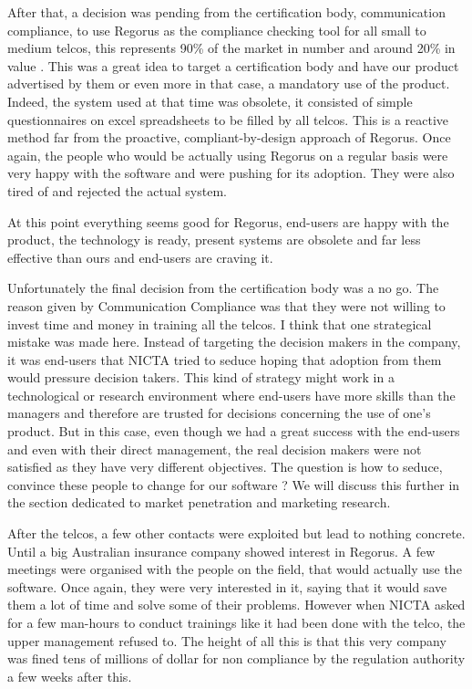 \documentclass[10pt]{report}
\begin{document}
After that, a decision was pending from the certification body, communication compliance, to use Regorus as the compliance checking tool for all small to medium telcos, this represents 90\% of the market in number and around 20\% in value \autocite{telcoIndustryStats}. This was a great idea to target a certification body and have our product advertised by them or even more in that case, a mandatory use of the product. Indeed, the system used at that time was obsolete, it consisted of simple questionnaires on excel spreadsheets to be filled by all telcos. This is a reactive method far from the proactive, compliant-by-design approach of Regorus. Once again, the people who would be actually using Regorus on a regular basis were very happy with the software and were pushing for its adoption. They were also tired of and rejected the actual system.

At this point everything seems good for Regorus, end-users are happy with the product, the technology is ready, present systems are obsolete and far less effective than ours and end-users are craving it.

Unfortunately the final decision from the certification body was a no go. The reason given by Communication Compliance was that they were not willing to invest time and money in training all the telcos. I think that one strategical mistake was made here. Instead of targeting the decision makers in the company, it was end-users that NICTA tried to seduce hoping that adoption from them would pressure decision takers. This kind of strategy might work in a technological or research environment where end-users have more skills than the managers and therefore are trusted for decisions concerning the use of one's product. But in this case, even though we had a great success with the end-users and even with their direct management, the real decision makers were not satisfied as they have very different objectives. The question is how to seduce, convince these people to change for our software ? We will discuss this further in the section dedicated to market penetration and marketing research.

After the telcos, a few other contacts were exploited but lead to nothing concrete. Until a big Australian insurance company showed interest in Regorus. A few meetings were organised with the people on the field, that would actually use the software. Once again, they were very interested in it, saying that it would save them a lot of time and solve some of their problems. However when NICTA asked for a few man-hours to conduct trainings like it had been done with the telco, the upper management refused to. The height of all this is that this very company was fined tens of millions of dollar for non compliance by the regulation authority a few weeks after this.
\end{document}
